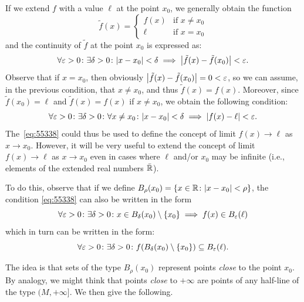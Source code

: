 If we extend $f$ with a value $\ell$ at the point $x_0$, we generally obtain 
the function 
\[
  \tilde f(x) = \begin{cases}
    f(x) & \text{if $x\neq x_0$}\\
    \ell & \text{if $x=x_0$}
  \end{cases}  
\]
and the continuity of $\tilde f$ at the point $x_0$ is expressed as:
\[
\forall\varepsilon>0\colon \exists \delta>0\colon
{\left|x-x_0\right|}<\delta \implies {\left|\tilde f(x)-\tilde f(x_0)\right|}<\varepsilon.  
\]
Observe that if $x=x_0$, then obviously ${\left|\tilde f(x)-\tilde f(x_0)\right|}
= 0 < \varepsilon$, so we can assume, in the previous condition, 
that $x\neq x_0$, and thus $\tilde f(x)=f(x)$. 
Moreover, since $\tilde f(x_0)=\ell$ 
and $\tilde f(x)=f(x)$ if $x\neq x_0$,
we obtain 
the following condition:
\begin{equation}\label{eq:55338}
\forall \varepsilon>0\colon \exists \delta >0 \colon 
  \forall x\neq x_0\colon
  {\left|x-x_0\right|}<\delta \implies {\left|f(x) - \ell\right|} < \varepsilon.
\end{equation}
The~\eqref{eq:55338} could thus be used to define 
the concept of limit $f(x)\to \ell$ as $x\to x_0$.
However, it will be very useful to extend the concept of limit $f(x)\to \ell$ 
as $x\to x_0$ even in cases where $\ell$ and/or $x_0$ may 
be infinite (i.e., elements of the extended real numbers $\bar {{\mathbb R}}$).

To do this, observe that
if we define%
$B_\rho(x_0) = {\left\{ x\in {\mathbb R} \colon {\left|x-x_0\right|}<\rho \right\}}$,
the condition \eqref{eq:55338}
can also be written in the form 
\[
  \forall \varepsilon>0\colon \exists \delta >0 \colon 
  x \in B_\delta(x_0)\setminus{\left\{ x_0 \right\}} \implies f(x) \in B_\varepsilon(\ell)  
\]
which in turn can be written in the form:
\[
  \forall \varepsilon>0\colon \exists \delta >0 \colon 
  f(B_\delta(x_0)\setminus{\left\{ x_0 \right\}}) \subseteq  B_\varepsilon(\ell).    
\]

The idea is that sets of the type
$B_\rho(x_0)$ 
represent points \emph{close} to the point $x_0$. 
By analogy, we might think that points \emph{close} 
to $+\infty$ are points of any half-line 
of the type $(M,+\infty]$.
We then give the following.


